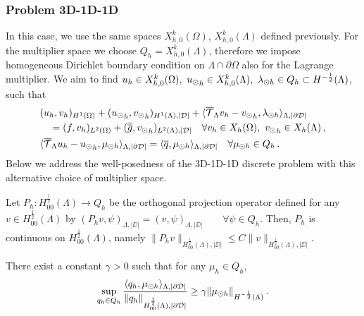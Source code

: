 \documentclass[r]{siamart171218}
\newcommand{\paoloold}[1]{{\color{black}#1}}
\begin{document}
\subsubsection{Problem 3D-1D-1D}
In this case, we use the same spaces $X_{h,0}^k(\Omega)$, $X_{h,0}^k(\Lambda)$ defined previously.
For the multiplier space we choose $Q_h=X_{h,0}^k(\Lambda)$, therefore we impose homogeneous Dirichlet boundary condition on $\Lambda \cap \partial \Omega$ also for the Lagrange multiplier. 
We aim to find  $u_h \in X_{h,0}^k(\Omega) ,\ {u_{\odot}}_h \in X_{h,0}^k(\Lambda), \ \lambda_{\odot h} \in Q_h \subset H^{-\frac12}(\Lambda)$, such that
\begin{subequations}
\begin{align}\label{eq:prob2_discrete}
&(u_h,v_h)_{H^1(\Omega)} + ({\ud}_h,{\vd}_h)_{H^1(\Lambda), |{\cal D}|} 
+  \langle  \mtrace v_h -  {\vd}_h, \ldh \rangle_{\Lambda, |\DD|} 
\\
\nonumber
&\quad = (f,v_h)_{L^2(\Omega)} + (\avrd{g},{\vd}_h)_{L^2(\Lambda),|\D|}
\quad \forall v_h \in X_h(\Omega), \ {\vd}_h \in X_h(\Lambda)\,,
\\
& \langle \mtrace u_h - {\ud}_h, \mdh \rangle_{\Lambda,| \DD| } 
= \paoloold{\langle \avrc{q},\mdh \rangle_{\Lambda,|\DD|}}
\quad \forall \mdh \in Q_h\,.
\end{align}
\end{subequations}
Below we address the well-posedness of the 3D-1D-1D discrete problem with this alternative choice of multiplier space.

\begin{lemma}\label{lemma:prob2_orthproj}
Let $P_h: H^{\frac 12}_{00}(\Lambda) \longrightarrow Q_h$ be the orthogonal projection operator defined  for any $v \in H^{\frac 12}_{00}(\Lambda)$ by $(P_h v , \psi)_{\Lambda,|\DD|}= (v, \psi)_{\Lambda , |\DD|} \qquad \forall \psi \in Q_h$.  
Then, $P_h$ is continuous on $H^{\frac 12}_{00}(\Lambda)$, namely
$\|P_h v\|_{H^{\frac 12}_{00}(\Lambda),|\DD|} \leq C \|v\|_{H^{\frac 12}_{00}(\Lambda),|\DD|}$.
\end{lemma}

\begin{lemma}\label{infsup_avr_trspace}
There exist a constant $\gamma >0$ such that for any $\mu_h \in Q_h$,
\begin{equation*}
\sup_{\substack{q_h \in Q_h}} \frac{\langle q_h , \mu_{\odot h} \rangle_{\Lambda, |\partial\mathcal{D}|}}{ \|q_h\|_{H^{\frac 12}_{00}(\Lambda),|\partial\mathcal{D}|}} \geq \gamma \|\mu_{\odot h}\|_{H^{-\frac 12}(\Lambda)}\,.
\end{equation*} 
\end{lemma}
\end{document}
